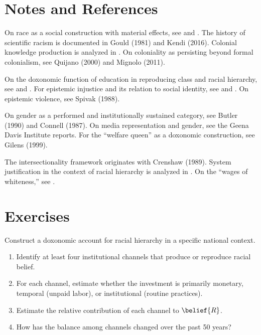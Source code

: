 \section{Notes and References}
\label{sec:ch24b-notes}

On race as a social construction with material effects, see \textcite{dubois1903} and \textcite{fanon1961}.
The history of scientific racism is documented in Gould (1981) and Kendi (2016).
Colonial knowledge production is analyzed in \textcite{said1978}.
On coloniality as persisting beyond formal colonialism, see Quijano (2000) and Mignolo (2011).

On the doxonomic function of education in reproducing class and racial hierarchy, see \textcite{bowles1976} and \textcite{bourdieu1984}.
For epistemic injustice and its relation to social identity, see \textcite{fricker2007} and \textcite{medina2013}.
On epistemic violence, see Spivak (1988).

On gender as a performed and institutionally sustained category, see Butler (1990) and Connell (1987).
On media representation and gender, see the Geena Davis Institute reports.
For the ``welfare queen'' as a doxonomic construction, see Gilens (1999).

The intersectionality framework originates with Crenshaw (1989).
System justification in the context of racial hierarchy is analyzed in \textcite{jost2004}.
On the ``wages of whiteness,'' see \textcite{du-bois2007}.

\section{Exercises}

\begin{exercise}
Construct a doxonomic account for racial hierarchy in a specific national context.
\begin{enumerate}[nosep]
  \item Identify at least four institutional channels that produce or reproduce racial belief.
  \item For each channel, estimate whether the investment is primarily monetary, temporal (unpaid labor), or institutional (routine practices).
  \item Estimate the relative contribution of each channel to $\belief{R}$.
  \item How has the balance among channels changed over the past 50 years?
\end{enumerate}
\end{exercise}

